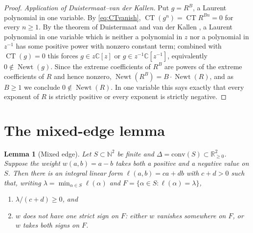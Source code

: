 \documentclass[10pt,a4paper]{amsart}
\newtheorem{lemma}[theorem]{Lemma}
\numberwithin{equation}{section}
\DeclareMathOperator{\CT}{CT}
\DeclareMathOperator{\Newt}{Newt}
\newcommand{\C}{\mathbb{C}}
\newcommand{\N}{\mathbb{N}}
\begin{document}
\begin{proof}
\smallskip
\noindent\emph{Application of Duistermaat--van der Kallen.} Put $g=R^{B}$, a
Laurent polynomial in one variable. By \eqref{eq:CTvanish},
$\CT(g^{n})=\CT R^{Bn}=0$ for every $n\ge1$. By the theorem of Duistermaat and
van der Kallen \cite{DvdK}, a Laurent polynomial in one variable which is
neither a polynomial in $z$ nor a polynomial in $z^{-1}$ has some positive power
with nonzero constant term; combined with $\CT(g)=0$ this forces
$g\in z\C[z]$ or $g\in z^{-1}\C[z^{-1}]$, equivalently $0\notin\Newt(g)$. Since
the extreme coefficients of $R^{B}$ are powers of the extreme coefficients of
$R$ and hence nonzero, $\Newt(R^{B})=B\cdot\Newt(R)$, and as $B\ge1$ we conclude
$0\notin\Newt(R)$. In one variable this says exactly that every exponent of $R$
is strictly positive or every exponent is strictly negative.
\end{proof}


\section{The mixed-edge lemma}\label{sec:edge}

\begin{lemma}[Mixed edge]\label{lem:edge}
Let $S\subset\N^2$ be finite and $\Delta=\mathrm{conv}(S)\subset\mathbb
R_{\ge0}^2$. Suppose the weight $w(a,b)=a-b$ takes both a positive and a
negative value on $S$. Then there is an integral linear form
$\ell(a,b)=ca+db$ with $c+d>0$ such that, writing
$\lambda=\min_{\alpha\in S}\ell(\alpha)$ and $F=\{\alpha\in S:\ell(\alpha)=\lambda\}$,
\begin{enumerate}
\item[(i)] $\lambda/(c+d)\ge0$, and
\item[(ii)] $w$ does not have one strict sign on $F$: either $w$ vanishes
somewhere on $F$, or $w$ takes both signs on $F$.
\end{enumerate}
\end{lemma}
\end{document}
